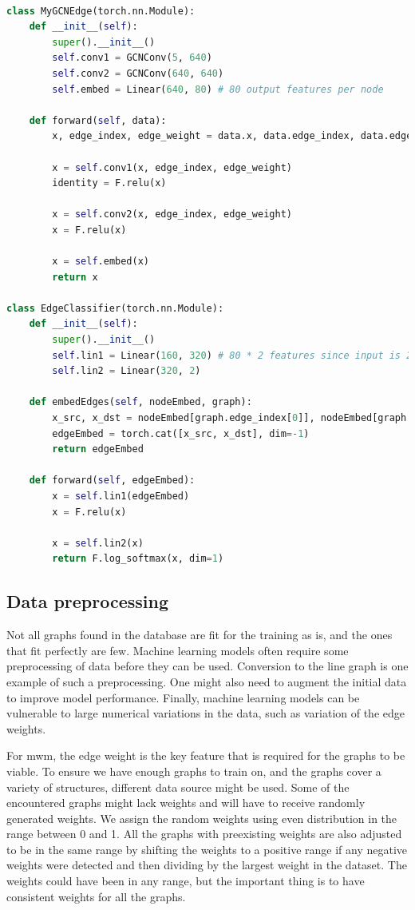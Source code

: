 \begin{lstlisting}[caption={Pytorch GCN for the edge classification}, label={Pytorch GCN for the edge prediction}, language=Python]

class MyGCNEdge(torch.nn.Module):
    def __init__(self):
        super().__init__()
        self.conv1 = GCNConv(5, 640)
        self.conv2 = GCNConv(640, 640)
        self.embed = Linear(640, 80) # 80 output features per node

    def forward(self, data):        
        x, edge_index, edge_weight = data.x, data.edge_index, data.edge_weight

        x = self.conv1(x, edge_index, edge_weight)
        identity = F.relu(x)
        
        x = self.conv2(x, edge_index, edge_weight)
        x = F.relu(x)
        
        x = self.embed(x)
        return x

class EdgeClassifier(torch.nn.Module):
    def __init__(self):
        super().__init__()
        self.lin1 = Linear(160, 320) # 80 * 2 features since input is 2 nodes.
        self.lin2 = Linear(320, 2)

    def embedEdges(self, nodeEmbed, graph):
        x_src, x_dst = nodeEmbed[graph.edge_index[0]], nodeEmbed[graph.edge_index[1]]
        edgeEmbed = torch.cat([x_src, x_dst], dim=-1)        
        return edgeEmbed

    def forward(self, edgeEmbed):        
        x = self.lin1(edgeEmbed)
        x = F.relu(x)
        
        x = self.lin2(x)
        return F.log_softmax(x, dim=1)

\end{lstlisting}

\subsection{Data preprocessing}
\label{sec:preprocessing}
Not all graphs found in the database are fit for the training as is, and the ones that fit perfectly are few. Machine learning models often require some preprocessing of data before they can be used. Conversion to the line graph is one example of such a preprocessing. One might also need to augment the initial data to improve model performance. Finally, machine learning models can be vulnerable to large numerical variations in the data, such as variation of the edge weights.

For \gls{mwm}, the edge weight is the key feature that is required for the graphs to be viable. To ensure we have enough graphs to train on, and the graphs cover a variety of structures, different data source might be used. Some of the encountered graphs might lack weights and will have to receive randomly generated weights. We assign the random weights using even distribution in the range between 0 and 1. All the graphs with preexisting weights are also adjusted to be in the same range by shifting the weights to a positive range if any negative weights were detected and then dividing by the largest weight in the dataset. The weights could have been in any range, but the important thing is to have consistent weights for all the graphs. 

